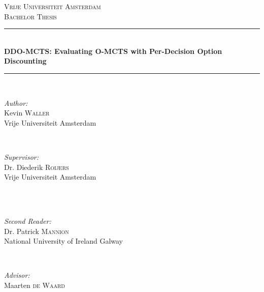 \documentclass[12pt,a4paper]{article}
\begin{document}
\begin{titlepage}

\newcommand{\HRule}{\rule{\linewidth}{0.5mm}} %

\center 
 

\textsc{\LARGE Vrije Universiteit Amsterdam}\\[1.5cm] 
\textsc{\Large Bachelor Thesis}\\[0.5cm] 


\HRule \\[0.4cm]
{ \huge \bfseries DDO-MCTS: Evaluating O-MCTS with Per-Decision Option Discounting}\\[0.4cm] 
\HRule \\[1.5cm]
 

\begin{minipage}{0.4\textwidth}
\begin{flushleft} \large
\emph{Author:}\\
Kevin \textsc{Waller} \\
Vrije Universiteit Amsterdam
\end{flushleft}
\end{minipage}
~
\begin{minipage}{0.4\textwidth}
\begin{flushright} \large
\emph{Supervisor:} \\
Dr. Diederik \textsc{Roijers} \\
Vrije Universiteit Amsterdam
\end{flushright}
\end{minipage}\\[1cm]
~
\begin{minipage}{0.4\textwidth}
\begin{flushleft} \large
\emph{Second Reader:} \\
Dr. Patrick \textsc{Mannion} \\
National University of Ireland Galway
\end{flushleft}
\end{minipage}
~
\begin{minipage}{0.4\textwidth}
\begin{flushright} \large
\emph{Advisor:} \\
Maarten \textsc{de Waard}
\end{flushright}
\end{minipage}\\[2cm]



\end{titlepage}
\end{document}
